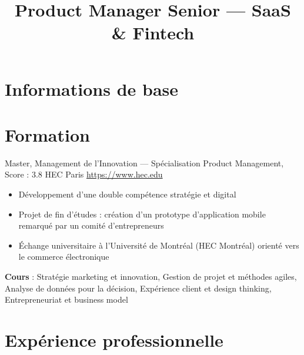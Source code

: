 \documentclass[a4paper, serif, 10pt]{moderncv}
\title{Product Manager Senior — SaaS \& Fintech}
\begin{document}
\maketitle

\section{Informations de base}

\section{Formation}

        {Master, Management de l'Innovation — Spécialisation Product Management, Score : 3.8}
        {HEC Paris}
        {\url{https://www.hec.edu}}
        {}
        {\begin{itemize}
\item Développement d'une double compétence stratégie et digital
\item Projet de fin d'études : création d'un prototype d'application mobile remarqué par un comité d'entrepreneurs
\item Échange universitaire à l'Université de Montréal (HEC Montréal) orienté vers le commerce électronique
\end{itemize}
\textbf{Cours} : Stratégie marketing et innovation, Gestion de projet et méthodes agiles, Analyse de données pour la décision, Expérience client et design thinking, Entrepreneuriat et business model}
\section{Expérience professionnelle}
\end{document}
